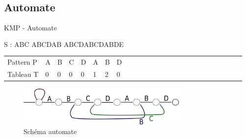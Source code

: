 \documentclass[12pt]{beamer}
\begin{document}
\subsection{Automate}
\begin{frame}{KMP - Automate}
\begin{center}

S : ABC ABCDAB ABCDABCDABDE \\
\end{center}

\begin{center}
\begin{tabular}{ l || p{0.01cm}p{0.01cm}p{0.01cm}p{0.01cm}p{0.01cm}p{0.01cm}p{0.01cm}p{0.01cm}p{0.01cm}p{0.01cm}p{0.01cm}p{0.01cm}p{0.01cm}p{0.01cm}p{0.01cm}p{0.01cm}p{0.01cm}p{0.01cm}p{0.01cm}p{0.01cm}p{0.01cm}p{0.01cm}p{0.01cm}p{0.01cm}} 
   Pattern P &A&B&C&D&A&B&D \\
   Tableau T &0&0&0&0&1&2&0 \\
\end{tabular}
\end{center}
\begin{figure}
	\centering
    \includegraphics[width=320px]{Schema/Automate.png}
	\caption{Schéma automate}
\end{figure}
\end{frame}
\end{document}
